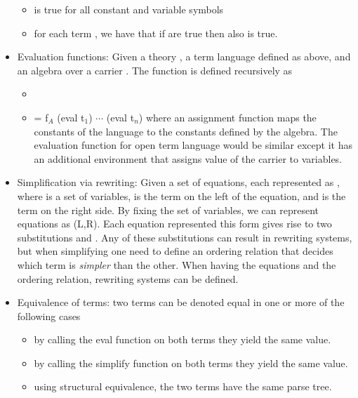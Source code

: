 \begin{itemize}
    \begin{itemize}
        \item {} is true for all constant and variable symbols 
        \item for each term , we have that if  are true then also  is true.  
    \end{itemize}     
    \item Evaluation functions: Given a theory , a term language defined as above, and an algebra over a carrier . The function  is defined recursively as 
    \begin{itemize}
        \item {}
        \item {} = f$_A$ (eval t$_1$) $\cdots$ (eval t$_n$) where an assignment function maps the constants of the language to the constants defined by the algebra. The evaluation function for open term language would be similar except it has an additional environment that assigns value of the carrier to variables. 
    \end{itemize}      
    \item Simplification via rewriting: Given a set of equations, each represented as , where  is a set of variables,  is the term on the left of the equation, and  is the term on the right side. By fixing the set of variables, we can represent equations as  (L,R). Each equation represented this form gives rise to two substitutions  and . Any of these substitutions can result in rewriting systems, but when simplifying one need to define an ordering relation that decides which term is \emph{simpler} than the other. When having the equations and the ordering relation, rewriting systems can be defined. 
    \item Equivalence of terms: two terms can be denoted equal in one or more of the following cases 
    \begin{itemize}
        \item by calling the eval function on both terms they yield the same value.  
        \item by calling the simplify function on both terms they yield the same value. 
        \item using structural equivalence, the two terms have the same parse tree. 

\end{itemize}
\end{itemize}
